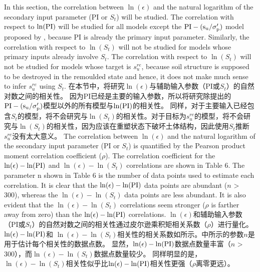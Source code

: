 \begin{Parallel}{0.60\textwidth}{}
{    }
    \ParallelPar
    
    \ParallelLText
    {
        In this section, the correlation between $\ln(\epsilon)$ and the natural logarithm of the secondary input parameter (PI or $S_t$) will be  studied. The correlation with respect to $\ln(\rm{PI})$ will be studied for all models except the $\rm{PI}-(s_u/\sigma_p')$ model proposed by \citet{Mesri1975409, Mesri1989162}, because PI is already the primary input parameter. Similarly, the correlation with respect to $\ln(S_t)$ will not be studied for models whose primary inputs already involve $S_t$. The correlation with respect to $\ln(S_t)$ will not be studied for models whose target is $s_u^{re}$, because soil structure is supposed to be destroyed in the  remoulded state and hence, it does not make much sense to infer $s_u^{re}$ using $S_t$.
    }
    \ParallelRText
    {
        在本节中，将研究$\ln(\epsilon)$与辅助输入参数（PI或$S_t$）的自然对数之间的相关性。 因为PI已经是主要的输入参数，所以将研究除\citet{Mesri1975409, Mesri1989162}提出的$\rm{PI}-(s_u/\sigma_p')$模型以外的所有模型与$\ln(\rm{PI})$的相关性。 同样，对于主要输入已经包含$S_t$的模型，将不会研究与$\ln(S_t)$的相关性。对于目标为$s_u^{re}$的模型，将不会研究与$\ln(S_t)$的相关性，因为应该在重塑状态下破坏土体结构，因此使用$S_t$推断$s_u^{re}$没有太大意义。
    }
    \ParallelPar
    \ParallelLText
    {
        The correlation between $\ln(\epsilon)$ and the natural logarithm of the secondary input parameter (PI or $S_t$) is quantified by the Pearson product moment correlation coefficient ($\rho$). The correlation coefficient for the $\ln(\epsilon)-\ln(\rm{PI})$ and $\ln(\epsilon)-\ln(S_t)$ correlations are shown in Table 6. The parameter n shown in Table 6 is the number of data points used to estimate each correlation. It is clear that the $\ln(\epsilon)-\ln(\rm{PI})$ data points are abundant ($n$ > 300), whereas the $\ln(\epsilon)-\ln(S_t)$ data points are less abundant. It is also evident that the $\ln(\epsilon)-\ln(S_t)$ correlations seem stronger ($\rho$ is farther away from zero) than the $\ln(\epsilon)-\ln(\rm{PI})$ correlations.
    }
    \ParallelRText
    {
        $\ln(\epsilon)$和辅助输入参数（PI或$S_t$）的自然对数之间的相关性通过皮尔逊乘积矩相关系数（$\rho$）进行量化。 $\ln(\epsilon)-\ln(\rm{PI})$和 $\ln(\epsilon)-\ln(S_t)$相关性的相关系数如所示。中所示的参数$n$是用于估计每个相关性的数据点数。 显然，$\ln(\epsilon)-\ln(\rm{PI})$数据点数量丰富（$n$ > 300），而$\ln(\epsilon)-\ln(S_t)$数据点数量较少。 同样明显的是，$\ln(\epsilon)-\ln(S_t)$相关性似乎比$\ln(\epsilon)-\ln(\rm{PI})$相关性更强（$\rho$离零更远）。
    }
    \ParallelPar
    
\end{Parallel}

